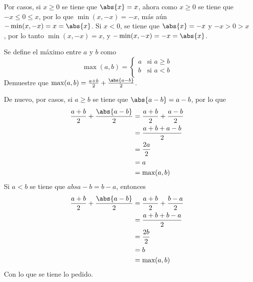 \documentclass{ayudantia}
\begin{document}
\begin{ans}
    \begin{sol}
        Por casos, si \(x\geq0\) se tiene que \(\abs{x}=x\), ahora como \(x\geq0\) se tiene que \(-x\leq 0\leq x\), por lo que \(\min(x,-x)=-x\), más aún \(-\min(x,-x)=x=\abs{x}\). Si \(x<0\), se tiene que \(\abs{x}=-x\) y \(-x>0>x\), por lo tanto \(\min(x,-x)=x\), y \(-\min(x,-x)=-x=\abs{x}\).
    \end{sol}
\end{ans}


\begin{prob}
    Se define el máximo entre \(a\) y \(b\) como
    \begin{equation*}
        \max(a,b)=\begin{cases}
            a&\text{si }a\geq b\\
            b&\text{si }a<b\\
        \end{cases}
    \end{equation*}
    Demuestre que \(\max(a,b)=\frac{a+b}2+\frac{\abs{a-b}}2\).
\end{prob}

\begin{ans}
    \begin{sol}
        De nuevo, por casos, si \(a\geq b\) se tiene que \(\abs{a-b}=a-b\), por lo que
        \begin{align*}
            \frac{a+b}2+\frac{\abs{a-b}}2&=\frac{a+b}2+\frac{a-b}2\\
            &=\frac{a+b+a-b}2\\
            &=\frac{2a}2\\
            &=a\\
            &=\max(a,b)\\
        \end{align*}
        Si \(a<b\) se tiene que \(abs{a-b}=b-a\), entonces
        \begin{align*}
            \frac{a+b}2+\frac{\abs{a-b}}2&=\frac{a+b}2+\frac{b-a}2\\
            &=\frac{a+b+b-a}2\\
            &=\frac{2b}2\\
            &=b\\
            &=\max(a,b)\\
        \end{align*}
        Con lo que se tiene lo pedido.
    \end{sol}
\end{ans}
\end{document}
